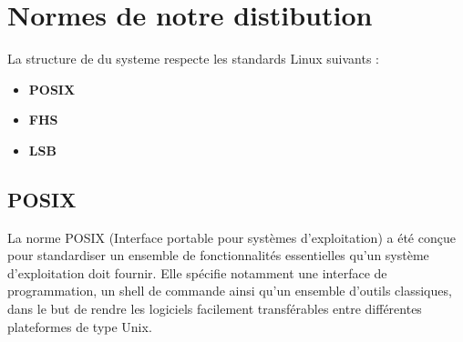 


\section{Normes de notre distibution}
\label{subsec:standards}

La structure de du systeme  respecte  les standards Linux suivants :

\begin{itemize}
  \item \textbf{POSIX}  
  \item \textbf{FHS } 
  \item \textbf{LSB  }
\end{itemize}


\subsection{POSIX}
\label{sssec:posix}
La norme POSIX (Interface portable pour systèmes d'exploitation) a été conçue pour standardiser un ensemble de fonctionnalités essentielles qu’un système d'exploitation doit fournir. Elle spécifie notamment une interface de programmation, un shell de commande ainsi qu’un ensemble d'outils classiques, dans le but de rendre les logiciels facilement transférables entre différentes plateformes de type Unix. 

